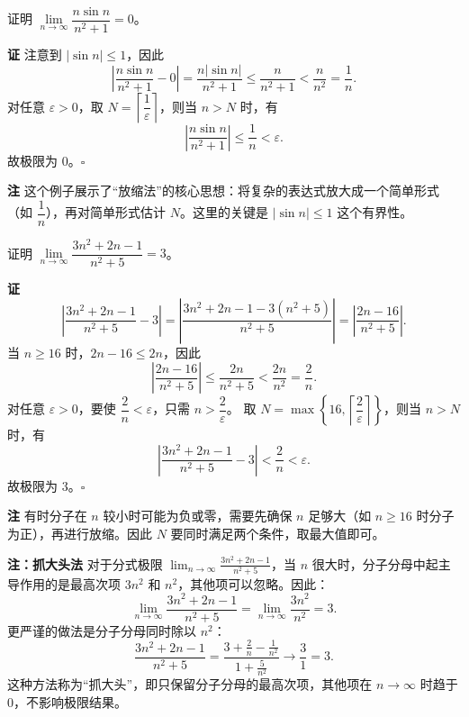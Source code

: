 \documentclass[fontset=fandol]{ctexart}
\newenvironment{custom}[1]{\par\noindent\textbf{#1}\quad}{\par\vspace{0.8em}}
\begin{document}
\begin{example}
证明 \(\lim\limits_{n\to\infty} \dfrac{n \sin n}{n^2 + 1} = 0\)。
\end{example}
\begin{custom}{证}
注意到 \(|\sin n| \leq 1\)，因此
\[
\left|\dfrac{n \sin n}{n^2 + 1} - 0\right| = \dfrac{n |\sin n|}{n^2 + 1} \leq \dfrac{n}{n^2 + 1} < \dfrac{n}{n^2} = \dfrac{1}{n}.
\]
对任意 \(\varepsilon > 0\)，取 \(N = \left\lceil \dfrac{1}{\varepsilon} \right\rceil\)，则当 \(n > N\) 时，有
\[
\left|\dfrac{n \sin n}{n^2 + 1}\right| \leq \dfrac{1}{n} < \varepsilon.
\]
故极限为 0。\(\square\)
\end{custom}

\begin{custom}{注}
这个例子展示了“放缩法”的核心思想：将复杂的表达式放大成一个简单形式（如 \(\dfrac{1}{n}\)），再对简单形式估计 \(N\)。这里的关键是 \(|\sin n| \leq 1\) 这个有界性。
\end{custom}

\begin{example}证明 \(\lim\limits_{n\to\infty} \dfrac{3n^2 + 2n - 1}{n^2 + 5} = 3\)。
\end{example}
\begin{custom}{证}
\[
\left|\dfrac{3n^2 + 2n - 1}{n^2 + 5} - 3\right| = \left|\dfrac{3n^2 + 2n - 1 - 3(n^2 + 5)}{n^2 + 5}\right| = \left|\dfrac{2n - 16}{n^2 + 5}\right|.
\]
当 \(n \geq 16\) 时，\(2n - 16 \leq 2n\)，因此
\[
\left|\dfrac{2n - 16}{n^2 + 5}\right| \leq \dfrac{2n}{n^2 + 5} < \dfrac{2n}{n^2} = \dfrac{2}{n}.
\]
对任意 \(\varepsilon > 0\)，要使 \(\dfrac{2}{n} < \varepsilon\)，只需 \(n > \dfrac{2}{\varepsilon}\)。
取 \(N = \max\left\{16, \left\lceil \dfrac{2}{\varepsilon} \right\rceil\right\}\)，则当 \(n > N\) 时，有
\[
\left|\dfrac{3n^2 + 2n - 1}{n^2 + 5} - 3\right| < \dfrac{2}{n} < \varepsilon.
\]
故极限为 3。\(\square\)
\end{custom}

\begin{custom}{注}
有时分子在 \(n\) 较小时可能为负或零，需要先确保 \(n\) 足够大（如 \(n \geq 16\) 时分子为正），再进行放缩。因此 \(N\) 要同时满足两个条件，取最大值即可。
\end{custom}

\begin{custom}{注：抓大头法}
对于分式极限 \(\lim_{n\to\infty} \frac{3n^2 + 2n - 1}{n^2 + 5}\)，当 \(n\) 很大时，分子分母中起主导作用的是最高次项 \(3n^2\) 和 \(n^2\)，其他项可以忽略。因此：
\[
\lim_{n\to\infty} \frac{3n^2 + 2n - 1}{n^2 + 5} = \lim_{n\to\infty} \frac{3n^2}{n^2} = 3.
\]
更严谨的做法是分子分母同时除以 \(n^2\)：
\[
\frac{3n^2 + 2n - 1}{n^2 + 5} = \frac{3 + \frac{2}{n} - \frac{1}{n^2}}{1 + \frac{5}{n^2}} \to \frac{3}{1} = 3.
\]
这种方法称为“抓大头”，即只保留分子分母的最高次项，其他项在 \(n\to\infty\) 时趋于 0，不影响极限结果。
\end{custom}
\end{document}

